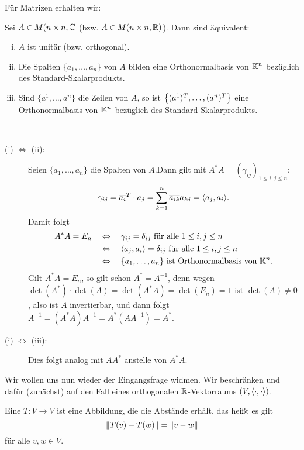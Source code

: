 Für Matrizen erhalten wir:

\begin{satz}
	\label{satz:6.9}
	Sei $A \in M(n \times n,\mathbb{C}$ (bzw. $A \in M(n \times n, \mathbb{R})$).
	Dann sind äquivalent:
	\begin{enumerate}[(i)]
		\item $A$ ist unitär (bzw. orthogonal).
		\item Die Spalten $\{a_1,\dots,a_n\}$ von $A$ bilden eine Orthonormalbasis von $\mathbb{K}^n$ bezüglich des Standard-Skalarprodukts.
		\item Sind $\{a^1,\dots,a^n\}$ die Zeilen von $A$, so ist $\left\{(a^1)^T,\dots,(a^n)^T\right\}$ eine Orthonormalbasis von $\mathbb{K}^n$ bezüglich des Standard-Skalarprodukts.
	\end{enumerate}
\end{satz}

\begin{beweis} \mbox{} \\[-.9cm]
	\begin{description}
		\item[(i) $\Leftrightarrow$ (ii):] Seien $\{a_1,\dots,a_n\}$ die Spalten von $A$.Dann gilt mit $A^*A = (\gamma_{ij})_{1 \leq i,j \leq n}$:
		\[
			\gamma_{ij} = \ol{a_i}^T \cdot a_j = \sum_{k=1}^{n} \ol{a_{ik}} a_{kj} = \sk{a_j,a_i}.
		\]
		Damit folgt
		\begin{align*}
			A^*A = E_n \quad &\Leftrightarrow \quad \gamma_{ij} = \delta_{ij} \text{ für alle } 1 \leq i,j \leq n \\
			&\Leftrightarrow \quad \left\langle a_j,a_i\right\rangle = \delta_{ij} \text{ für alle } 1 \leq i,j \leq n \\
			&\Leftrightarrow \quad \{a_1,\dots,a_n\} \text{ ist Orthonormalbasis von } \mathbb{K}^n.
		\end{align*}
		\newpage
		Gilt $A^*A = E_n$, so gilt schon $A^* = A^{-1}$, denn wegen $\det(A^*) \cdot \det(A) = \det(A^*A) = \det(E_n) = 1$ ist $\det(A) \neq 0$, also ist $A$ invertierbar, und dann folgt $A^{-1} = (A^*A)A^{-1} = A^*(AA^{-1}) = A^*$.
		\item[(i) $\Leftrightarrow$ (iii):] Dies folgt analog mit $AA^*$ anstelle von $A^*A$. \qedhere
	\end{description}
\end{beweis}

Wir wollen uns nun wieder der Eingangsfrage widmen.
Wir beschränken und dafür (zunächst) auf den Fall eines orthogonalen $\mathbb{R}$-Vektorraums $(V,\left\langle\cdot,\cdot\right\rangle)$.

\begin{definition}
	\label{def:6.10}
	Eine  $T \colon V \rightarrow V$ ist eine Abbildung, die die Abstände erhält, das heißt es gilt
	\[
		\left\lVert T(v) - T(w)\right\rVert = \left\lVert v-w\right\rVert
	\]
	für alle $v,w \in V$.
\end{definition}

